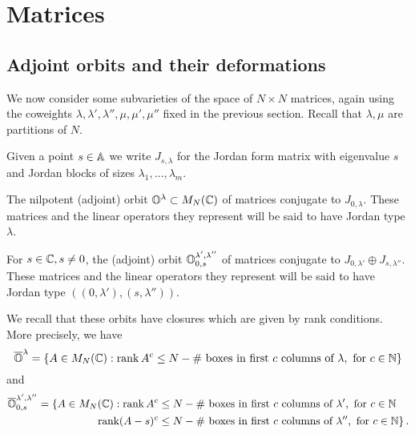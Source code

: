 \documentclass[draft]{article} %
\begin{document}
\section{Matrices}
\label{s:mats}
% 
\subsection{Adjoint orbits and their deformations}
\label{ss:familiesofadjointorbits}
% 
We now consider some subvarieties of the space of $ N\times N$ matrices, again using the coweights $ \lambda, \lambda', \lambda'', \mu, \mu', \mu''$ fixed in the previous section. 
Recall that $\lambda, \mu $ are partitions of $ N$.

Given a point $ s \in \AA$ we write $ J_{s,\lambda}$ for the Jordan form matrix with eigenvalue $ s$ and Jordan blocks of sizes $ \lambda_1, \dots, \lambda_m$.
    
\begin{definition}
\label{def:Olam}
The nilpotent (adjoint) orbit $ \OO^\lambda \subset M_N(\CC)$ of matrices conjugate to $ J_{0,\lambda}$. These matrices and the linear operators they represent will be said to have Jordan type $\lambda$.
\end{definition}  
% 
% 
\begin{definition}
\label{def:Olamlam}
    For $ s \in \CC, s \ne 0$, the (adjoint) orbit $ \OO^{\lambda', \lambda''}_{0,s}$ of matrices conjugate to $ J_{0,\lambda'} \oplus J_{s,\lambda''}$.
    These matrices and the linear operators they represent will be said to have Jordan type $((0,\lambda'), (s,\lambda''))$.
\end{definition}  
% 

% 

     
We recall that these orbits have closures which are given by rank conditions.  
More precisely, we have
$$
    \overline{\OO}^\lambda = \{ A \in M_N(\CC) : \rk A^c \le N - \#\text{~boxes in first $c$ columns of }\lambda,  \text{ for $ c \in \NN$} \}
$$
and
\begin{equation} 
\label{eq:ranks}
\begin{split}
    \overline{\OO}^{\lambda', \lambda''}_{0,s} = \{ A \in M_N(\CC) : \rk A^c &\le N - 
    \#\text{~boxes in first $c$ columns of }\lambda',  \text{ for $ c \in \NN$} \\
    \rk (A-s)^c &\le N - \#\text{~boxes in first $c$ columns of }\lambda'',  \text{ for $ c \in \NN$} \}\,. 
\end{split}
\end{equation}
%  
\end{document}
